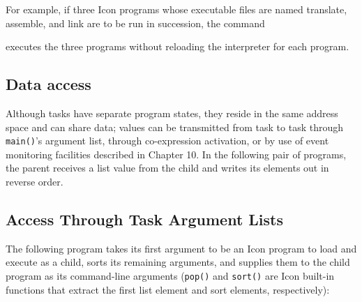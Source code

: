 
For example, if three Icon programs whose executable files are named
translate, assemble, and link are to be run in succession, the command


\noindent
executes the three programs without reloading the interpreter for each
program.

\subsection*{Data access}

Although tasks have separate program states, they reside in the same
address space and can share data; values can be transmitted from task
to task through {\texttt{main()}}'s argument list, through
co-expression activation, or by use of event monitoring facilities
described in Chapter 10. In the following pair of programs, the
parent receives a list value from the child and writes its elements
out in reverse order.



\subsection*{Access Through Task Argument Lists}

The following program takes its first argument to be an Icon program
to load and execute as a child, sorts its remaining arguments, and
supplies them to the child program as its command-line arguments
({\tt pop()} and {\tt sort()} are Icon built-in functions that extract
the first list element and sort elements, respectively):

